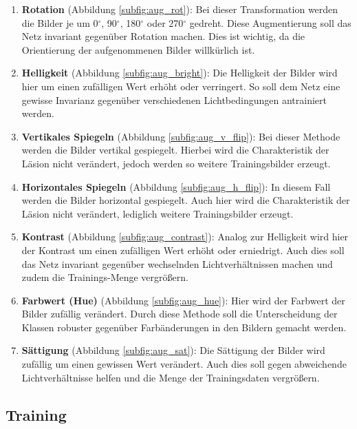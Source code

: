 \begin{enumerate}
    \item \textbf{Rotation} (Abbildung \ref{subfig:aug_rot}): Bei dieser Transformation werden die Bilder je um 0$^{\circ}$, 90$^{\circ}$, 180$^{\circ}$ oder 270$^{\circ}$ gedreht. Diese Augmentierung soll das Netz invariant gegenüber Rotation machen. Dies ist wichtig, da die Orientierung der aufgenommenen Bilder willkürlich ist.
    
    \item \textbf{Helligkeit} (Abbildung \ref{subfig:aug_bright}):  Die Helligkeit der Bilder wird hier um einen zufälligen Wert erhöht oder verringert. So soll dem Netz eine gewisse Invarianz gegenüber verschiedenen Lichtbedingungen antrainiert werden.
    
    \item \textbf{Vertikales Spiegeln} (Abbildung \ref{subfig:aug_v_flip}): Bei dieser Methode werden die Bilder vertikal gespiegelt. Hierbei wird die Charakteristik der Läsion nicht verändert, jedoch werden so weitere Trainingsbilder erzeugt. 
    
    \item \textbf{Horizontales Spiegeln} (Abbildung \ref{subfig:aug_h_flip}):  In diesem Fall werden die Bilder horizontal gespiegelt. Auch hier wird die Charakteristik der Läsion nicht verändert, lediglich weitere Trainingsbilder erzeugt.
    
    \item \textbf{Kontrast} (Abbildung \ref{subfig:aug_contrast}):  Analog zur Helligkeit wird hier der Kontrast um einen zufälligen Wert erhöht oder erniedrigt. Auch dies soll das Netz invariant gegenüber wechselnden Lichtverhältnissen machen und zudem die Trainings-Menge vergrößern.
    
    \item \textbf{Farbwert (Hue)} (Abbildung \ref{subfig:aug_hue}):  Hier wird der Farbwert der Bilder zufällig verändert. Durch diese Methode soll die Unterscheidung der Klassen robuster gegenüber Farbänderungen in den Bildern gemacht werden.
    
    \item \textbf{Sättigung} (Abbildung \ref{subfig:aug_sat}):  Die Sättigung der Bilder wird zufällig um einen gewissen Wert verändert. Auch dies soll gegen abweichende Lichtverhältnisse helfen und die Menge der Trainingsdaten vergrößern.
\end{enumerate}

\subsection{Training}
\label{training}

